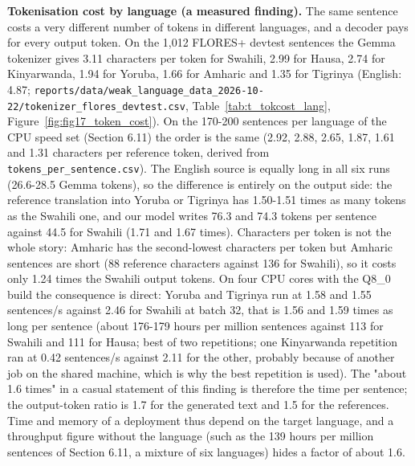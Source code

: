 \textbf{Tokenisation cost by language (a measured finding).} The same sentence costs a very different number of tokens in different languages, and a decoder pays for every output token. On the 1,012 FLORES+ devtest sentences the Gemma tokenizer gives 3.11 characters per token for Swahili, 2.99 for Hausa, 2.74 for Kinyarwanda, 1.94 for Yoruba, 1.66 for Amharic and 1.35 for Tigrinya (English: 4.87; \texttt{reports/data/weak\_language\_data\_2026-10-22/tokenizer\_flores\_devtest.csv}, Table~\ref{tab:t_tokcost_lang}, Figure~\ref{fig:fig17_token_cost}). On the 170-200 sentences per language of the CPU speed set (Section 6.11) the order is the same (2.92, 2.88, 2.65, 1.87, 1.61 and 1.31 characters per reference token, derived from \texttt{tokens\_per\_sentence.csv}). The English source is equally long in all six runs (26.6-28.5 Gemma tokens), so the difference is entirely on the output side: the reference translation into Yoruba or Tigrinya has 1.50-1.51 times as many tokens as the Swahili one, and our model writes 76.3 and 74.3 tokens per sentence against 44.5 for Swahili (1.71 and 1.67 times). Characters per token is not the whole story: Amharic has the second-lowest characters per token but Amharic sentences are short (88 reference characters against 136 for Swahili), so it costs only 1.24 times the Swahili output tokens. On four CPU cores with the Q8\_0 build the consequence is direct: Yoruba and Tigrinya run at 1.58 and 1.55 sentences/s against 2.46 for Swahili at batch 32, that is 1.56 and 1.59 times as long per sentence (about 176-179 hours per million sentences against 113 for Swahili and 111 for Hausa; best of two repetitions; one Kinyarwanda repetition ran at 0.42 sentences/s against 2.11 for the other, probably because of another job on the shared machine, which is why the best repetition is used). The "about 1.6 times" in a casual statement of this finding is therefore the time per sentence; the output-token ratio is 1.7 for the generated text and 1.5 for the references. Time and memory of a deployment thus depend on the target language, and a throughput figure without the language (such as the 139 hours per million sentences of Section 6.11, a mixture of six languages) hides a factor of about 1.6.

